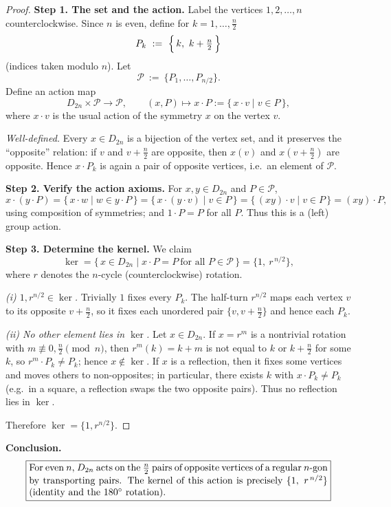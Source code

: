 \documentclass[12pt]{article}
\theoremstyle{definition}
\begin{document}
\begin{proof}
\noindent\textbf{Step 1. The set and the action.}
Label the vertices $1,2,\dots,n$ counterclockwise. Since $n$ is even, define for $k=1,\dots,\tfrac n2$
\[
P_k \ :=\ \Bigl\{\,k,\ k+\tfrac n2\,\Bigr\}
\]
(indices taken modulo $n$). Let
\[
\mathcal P \ :=\ \{P_1,\dots,P_{n/2}\}.
\]
Define an action map
\[
D_{2n}\times \mathcal P \longrightarrow \mathcal P,\qquad (x,P)\longmapsto x\cdot P:=\{\,x\cdot v\mid v\in P\,\},
\]
where $x\cdot v$ is the usual action of the symmetry $x$ on the vertex $v$.

\smallskip
\noindent\emph{Well-defined.} Every $x\in D_{2n}$ is a bijection of the vertex set, and it preserves the “opposite” relation:
if $v$ and $v+\tfrac n2$ are opposite, then $x(v)$ and $x(v+\tfrac n2)$ are opposite. Hence $x\cdot P_k$ is again a pair of
opposite vertices, i.e.\ an element of $\mathcal P$.

\smallskip
\noindent\textbf{Step 2. Verify the action axioms.}
For $x,y\in D_{2n}$ and $P\in\mathcal P$,
\[
x\cdot(y\cdot P)=\{\,x\cdot w\mid w\in y\cdot P\,\}=\{\,x\cdot(y\cdot v)\mid v\in P\,\}=\{\, (xy)\cdot v\mid v\in P\,\}=(xy)\cdot P,
\]
using composition of symmetries; and $1\cdot P=P$ for all $P$. Thus this is a (left) group action.

\smallskip
\noindent\textbf{Step 3. Determine the kernel.}
We claim
\[
\ker=\{\,x\in D_{2n}\mid x\cdot P=P\ \text{for all }P\in\mathcal P\,\}=\{1,\ r^{\,n/2}\},
\]
where $r$ denotes the $n$-cycle (counterclockwise) rotation.

\smallskip
\noindent\emph{(i) $1,r^{n/2}\in\ker$.}
Trivially $1$ fixes every $P_k$. The half-turn $r^{n/2}$ maps each vertex $v$ to its opposite $v+\tfrac n2$,
so it fixes each unordered pair $\{v, v+\tfrac n2\}$ and hence each $P_k$.

\smallskip
\noindent\emph{(ii) No other element lies in $\ker$.}
Let $x\in D_{2n}$. If $x=r^m$ is a nontrivial rotation with $m\not\equiv 0,\tfrac n2\pmod n$, then
$r^m(k)=k+m$ is not equal to $k$ or $k+\tfrac n2$ for some $k$, so $r^m\cdot P_k\neq P_k$; hence $x\notin\ker$.
If $x$ is a reflection, then it fixes some vertices and moves others to non-opposites; in particular, there exists $k$
with $x\cdot P_k\neq P_k$ (e.g.\ in a square, a reflection swaps the two opposite pairs). Thus no reflection lies in $\ker$.

\smallskip
Therefore $\ker=\{1,r^{n/2}\}$.
\end{proof}

\noindent\textbf{Conclusion.}
\[
\boxed{\parbox{0.9\linewidth}{
For even $n$, $D_{2n}$ acts on the $\tfrac n2$ pairs of opposite vertices of a regular $n$-gon by transporting pairs.
The kernel of this action is precisely $\{1,\ r^{\,n/2}\}$ (identity and the $180^\circ$ rotation).
}}
\]
\end{document}
